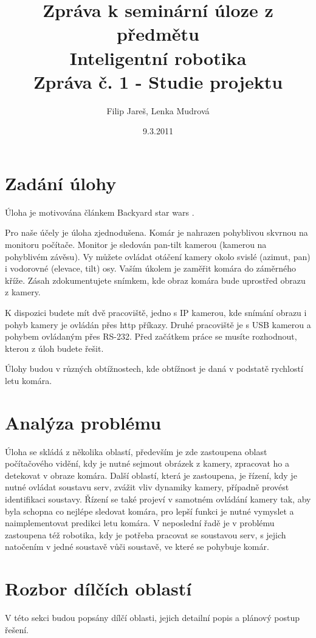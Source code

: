 \documentclass[a4paper,10pt]{article}
\title{Zpráva k seminární úloze z předmětu\\ Inteligentní robotika \\ {\small Zpráva č. 1 - Studie projektu}}
\author{Filip Jareš, Lenka Mudrová}
\date{9.3.2011}
\begin{document}
\maketitle

\section*{Zadání úlohy}
Úloha je motivována článkem Backyard star wars \cite{zadani}.

Pro naše účely je úloha zjednodušena. Komár je nahrazen pohyblivou skvrnou na monitoru počítače. Monitor je sledován pan-tilt kamerou (kamerou na pohyblivém závěsu). Vy můžete ovládat otáčení kamery okolo svislé (azimut, pan) i vodorovné (elevace, tilt) osy. Vaším úkolem je zaměřit komára do záměrného kříže. Zásah zdokumentujete snímkem, kde obraz komára bude uprostřed obrazu z kamery.

K dispozici budete mít dvě pracoviště, jedno s IP kamerou, kde snímání obrazu i pohyb kamery je ovládán přes http příkazy. Druhé pracoviště je s USB kamerou a pohybem ovládaným přes RS-232. Před začátkem práce se musíte rozhodnout, kterou z úloh budete řešit.

Úlohy budou v různých obtížnostech, kde obtížnost je daná v podstatě rychlostí letu komára.

\section{Analýza problému}
Úloha se skládá z několika oblastí, především je zde zastoupena oblast počítačového vidění, kdy je nutné sejmout obrázek z kamery, zpracovat ho a detekovat v obraze komára. Další oblastí, která je zastoupena, je řízení, kdy je nutné ovládat soustavu serv, zvážit vliv dynamiky kamery, případně provést identifikaci soustavy. Řízení se také projeví v samotném ovládání kamery tak, aby byla schopna co nejlépe sledovat komára, pro lepší funkci je nutné vymyslet a naimplementovat predikci letu komára. V neposlední řadě je v problému zastoupena též robotika, kdy je potřeba pracovat se soustavou serv, s jejich natočením v jedné soustavě vůči soustavě, ve které se pohybuje komár.

\section{Rozbor dílčích oblastí}

V této sekci budou popsány dílčí oblasti, jejich detailní popis a plánový postup řešení. 
\end{document}
